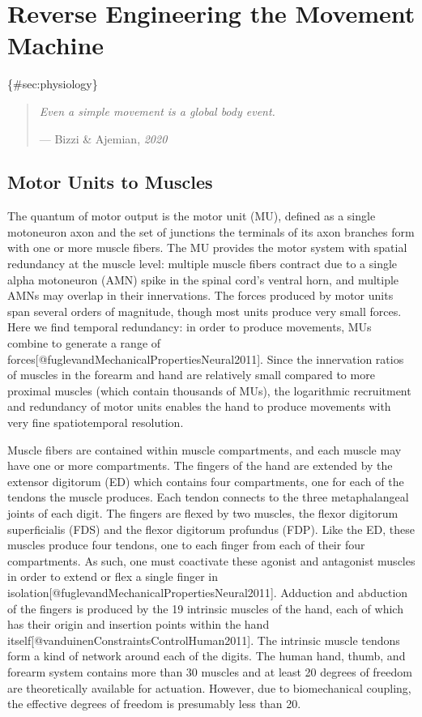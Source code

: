 \section{Reverse Engineering the Movement
Machine}\label{reverse-engineering-the-movement-machine}

\{\#sec:physiology\}

\begin{quote}
\emph{Even a simple movement is a global body event.}

--- Bizzi \& Ajemian, \emph{2020}
\end{quote}

\subsection{Motor Units to Muscles}\label{motor-units-to-muscles}

The quantum of motor output is the motor unit (MU), defined as a single
motoneuron axon and the set of junctions the terminals of its axon
branches form with one or more muscle fibers. The MU provides the motor
system with spatial redundancy at the muscle level: multiple muscle
fibers contract due to a single alpha motoneuron (AMN) spike in the
spinal cord's ventral horn, and multiple AMNs may overlap in their
innervations. The forces produced by motor units span several orders of
magnitude, though most units produce very small forces. Here we find
temporal redundancy: in order to produce movements, MUs combine to
generate a range of
forces{[}@fuglevandMechanicalPropertiesNeural2011{]}. Since the
innervation ratios of muscles in the forearm and hand are relatively
small compared to more proximal muscles (which contain thousands of
MUs), the logarithmic recruitment and redundancy of motor units enables
the hand to produce movements with very fine spatiotemporal resolution.

Muscle fibers are contained within muscle compartments, and each muscle
may have one or more compartments. The fingers of the hand are extended
by the extensor digitorum (ED) which contains four compartments, one for
each of the tendons the muscle produces. Each tendon connects to the
three metaphalangeal joints of each digit. The fingers are flexed by two
muscles, the flexor digitorum superficialis (FDS) and the flexor
digitorum profundus (FDP). Like the ED, these muscles produce four
tendons, one to each finger from each of their four compartments. As
such, one must coactivate these agonist and antagonist muscles in order
to extend or flex a single finger in
isolation{[}@fuglevandMechanicalPropertiesNeural2011{]}. Adduction and
abduction of the fingers is produced by the 19 intrinsic muscles of the
hand, each of which has their origin and insertion points within the
hand itself{[}@vanduinenConstraintsControlHuman2011{]}. The intrinsic
muscle tendons form a kind of network around each of the digits. The
human hand, thumb, and forearm system contains more than 30 muscles and
at least 20 degrees of freedom are theoretically available for
actuation. However, due to biomechanical coupling, the effective degrees
of freedom is presumably less than 20.

